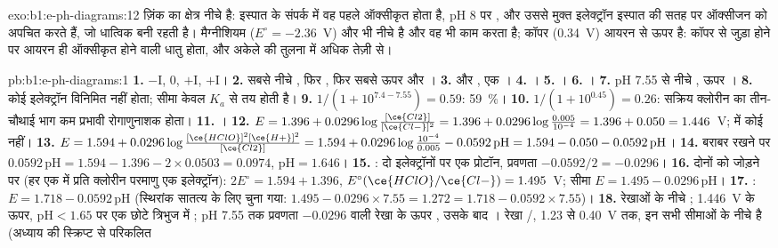 \begin{solution}{exo:b1:e-ph-diagrams:12}
ज़िंक का क्षेत्र नीचे है: इस्पात के संपर्क में वह पहले
ऑक्सीकृत होता है, pH 8 पर , और उससे
मुक्त इलेक्ट्रॉन इस्पात की सतह पर ऑक्सीजन को अपचित करते हैं, जो धात्विक बनी रहती है।
मैग्नीशियम ($E^\circ = -2.36$~V) और भी नीचे है और वह भी काम करता है; कॉपर
(0.34~V) आयरन से ऊपर है: कॉपर से जुड़ा होने पर आयरन ही
ऑक्सीकृत होने वाली धातु होता, और अकेले की तुलना में अधिक तेज़ी से।
\end{solution}

\begin{solution}{pb:b1:e-ph-diagrams:1}
\textbf{1.} $-$I, 0, $+$I, $+$I।
\textbf{2.} सबसे नीचे , फिर , फिर सबसे ऊपर  और ।
\textbf{3.}  और , एक ।
\textbf{4.} ।
\textbf{5.} ।
\textbf{6.} ।
\textbf{7.} pH 7.55 से नीचे , ऊपर ।
\textbf{8.} कोई इलेक्ट्रॉन विनिमित नहीं होता; सीमा केवल $K_a$ से तय होती है।
\textbf{9.} $1/(1 + 10^{7.4 - 7.55}) = 0.59$: \qty{59}{\percent}।
\textbf{10.} $1/(1 + 10^{0.45}) = 0.26$: सक्रिय क्लोरीन का तीन-चौथाई भाग
कम प्रभावी रोगाणुनाशक  होता।
\textbf{11.} ।
\textbf{12.} $E = 1.396 + 0.0296\log\frac{[\ce{Cl2}]}{[\ce{Cl-}]^2} = 1.396
+ 0.0296\log\frac{0.005}{10^{-4}} = 1.396 + 0.050 = 1.446$~V;  में
कोई  नहीं।
\textbf{13.} $E = 1.594 + 0.0296\log\frac{[\ce{HClO}]^2[\ce{H+}]^2}{[\ce{Cl2}]}
= 1.594 + 0.0296\log\frac{10^{-4}}{0.005} - 0.0592\,\mathrm{pH} = 1.594 -
0.050 - 0.0592\,\mathrm{pH}$।
\textbf{14.} बराबर रखने पर $0.0592\,\mathrm{pH} = 1.594 - 1.396 - 2 \times 0.0503
= 0.0974$, $\mathrm{pH} = 1.646$।
\textbf{15.} : दो इलेक्ट्रॉनों पर एक प्रोटॉन,
प्रवणता $-0.0592/2 = -0.0296$।
\textbf{16.} दोनों  को जोड़ने पर (हर एक में प्रति क्लोरीन परमाणु एक
इलेक्ट्रॉन): $2E^\circ = 1.594 + 1.396$, $E^\circ(\ce{HClO}/\ce{Cl-}) =
1.495$~V; सीमा $E = 1.495 - 0.0296\,\mathrm{pH}$।
\textbf{17.} : $E = 1.718 - 0.0592\,\mathrm{pH}$
(स्थिरांक सातत्य के लिए चुना गया: $1.495 - 0.0296 \times 7.55 = 1.272 = 1.718
- 0.0592 \times 7.55$)।
\textbf{18.} रेखाओं के नीचे ; 1.446~V के ऊपर,
$\mathrm{pH} < 1.65$ पर एक छोटे त्रिभुज में ; pH 7.55 तक प्रवणता
$-0.0296$ वाली रेखा के ऊपर , उसके बाद । रेखा /,
1.23 से 0.40~V तक, इन सभी सीमाओं के नीचे है (अध्याय की स्क्रिप्ट से परिकलित

\end{solution}
